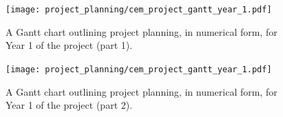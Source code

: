 \documentclass[../../main.tex]{subfiles}
\begin{document}
\begin{figure}
\centering
\texttt{[image: project\_planning/cem\_project\_gantt\_year\_1.pdf]}
\caption{\label{fig:gantt_1b} A Gantt chart outlining project planning, in numerical form, for Year 1 of the project (part 1).}
\end{figure}

\begin{figure}
\centering
\texttt{[image: project\_planning/cem\_project\_gantt\_year\_1.pdf]}
\caption{\label{fig:gantt_1c} A Gantt chart outlining project planning, in numerical form, for Year 1 of the project (part 2).}
\end{figure}
\end{document}
